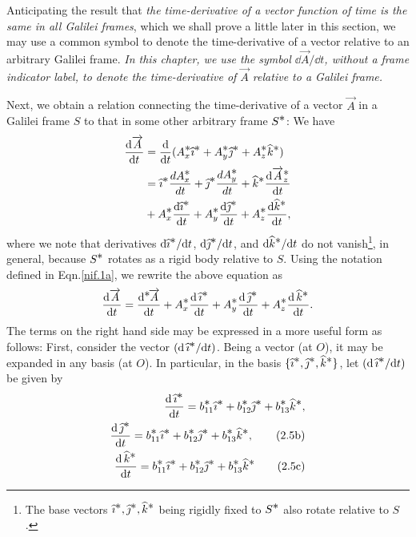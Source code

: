 Anticipating the result that \textsl{the time-derivative of 
a vector function of time is the same in all \textsl{Galilei 
frames}}, which we shall prove a little later in this 
section, we may use a common symbol to denote the 
time-derivative of a vector relative to an arbitrary Galilei 
frame. \textsl{In this chapter, we use the symbol $\dd 
\vec{A}/\dd t$, \textsl{without a frame indicator label}, to 
denote the time-derivative of $\vec{A}$ relative to a 
Galilei frame.}

Next, we obtain a relation connecting the time-derivative of 
a vector $\vec{A}$ in a Galilei frame $S$ to that in some 
other arbitrary frame $S^\bst$: We have
\begin{align*}
\dv{\vec{A}}{t}&=\dv{}{t}
(A^{\bst}_x\eye^{\bst}+A^{\bst}_y\jay^{\bst}
+A^{\bst }_z\kay^{\bst})
 \\& =\eye^{\bst} \frac{dA^{\bst}_x}{dt}+
\jay^{\bst}\frac{dA^{\bst}_y}{dt}
+\kay^{\bst}\dv{\vec{A}^{\bst}_z}{t}\notag\\ &+ 
A^{\bst}_x
\dv{\eye^{\bst}}{t}+A^{\bst}_y
\dv{\jay^{\bst}}{t} +A^{\bst}_z
\dv{\kay^{\bst}}{t},
\end{align*}
where we note that derivatives $\dd\eye^{\bst}/ \dd t$, 
$\dd\jay^{\bst}/ \dd t$, and $\dd\kay^{\bst}/ \dd t$ do not 
vanish\footnote{The base vectors $\eye^{\bst}, \jay^{\bst}, 
\kay^{\bst}$ being rigidly fixed to $S^{\bst}$ also rotate 
relative to $S$.}, in general, because $S ^{\bst}$ rotates 
as a rigid body relative to $S$. Using the notation defined 
in Eqn.\eqref{nif.1a}, we rewrite the above equation as
\begin{align}\label{nif.2a}
\dv{\vec{A}}{t}=\ldv{\bst}{\vec{A}}{t}+ A^{\bst}_x
\dv{\,\eye^{\bst}}{t}+A^{\bst}_y \dv{\,\jay^{\bst}}{t}
+A^{\bst}_z \dv{\,\kay^{\bst}}{t}.
\end{align}
The terms on the right hand side may be expressed in a more 
useful form as follows: First, consider the vector 
$(\dd\,\eye^{\bst}/\dd t)$. Being a vector (at $O$), it may 
be expanded in any basis (at $O$). In particular, in the 
basis $\{\eye^{\bst}, \jay^{\bst},\kay^{\bst}\}$, let 
$(\dd\,\eye^{\bst}/\dd t)$ be given by
\begin{align}\label{nif.3}
\dv{\,\eye^{\bst}}{t} =
b^{\bst}_{11}\eye^{\bst}+b^{\bst}_{12}\jay^{\bst}
+b^{\bst}_{13}\kay^{\bst},\\
\dv{\,\jay^{\bst}}{t} =
b^{\bst}_{11}\eye^{\bst}+b^{\bst}_{12}\jay^{\bst}
+b^{\bst}_{13}\kay^{\bst},\tag{2.5b}\\
\dv{\,\kay^{\bst}}{t} =
b^{\bst}_{11}\eye^{\bst}+b^{\bst}_{12}\jay^{\bst}
+b^{\bst}_{13}\kay^{\bst}\tag{2.5c}
\end{align}
